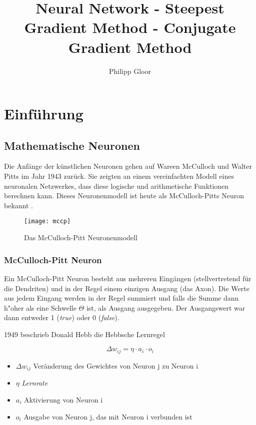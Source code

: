 \documentclass[10pt]{article}
\renewcommand{\sectionmark}[1]{\markboth{\MakeUppercase{#1}}{}}
\begin{document}
\title{Neural Network - Steepest Gradient Method - Conjugate Gradient Method}
\author{Philipp Gloor}
\maketitle

\newpage
\pagestyle{fancy}
\renewcommand{\sectionmark}[1]{\markright{#1}{}}
\tableofcontents
\section{Einführung}
\subsection{Mathematische Neuronen}

Die Anfänge der künstlichen Neuronen gehen auf Wareen McCulloch und Walter Pitts im Jahr 1943 zurück. Sie zeigten an einem vereinfachten Modell eines neuronalen Netzwerkes, dass diese logische und arithmetische Funktionen berechnen kann. Dieses Neuronenmodell ist heute als McCulloch-Pitts Neuron bekannt \cite{mccullochpitt}.

\begin{figure}[h!]
\centering
\texttt{[image: mccp]}
\caption{Das McCulloch-Pitt Neuronenmodell}
\end{figure}

\subsubsection{McCulloch-Pitt Neuron}

Ein McCulloch-Pitt Neuron besteht aus mehreren Eingängen (stellvertretend für die Dendriten) und in der Regel einem einzigen Ausgang (das Axon). Die Werte aus jedem Eingang werden in der Regel summiert und falls die Summe dann h"oher als eine Schwelle $\Theta$ ist, als Ausgang ausgegeben. Der Ausgangswert war dann entweder 1 (\textit{true}) oder 0 (\textit{false}).

1949 beschrieb Donald Hebb die Hebbsche Lernregel

\begin{equation}
\Delta w_{ij} = \eta\cdot a_i\cdot o_i
\end{equation}
\begin{itemize}
\item \( \Delta w_{ij} \) Veränderung des Gewichtes von Neuron j zu Neuron i
\item \( \eta \) \textit{Lernrate}
\item \( a_i  \) Aktivierung von Neuron i
\item \( o_i  \) Ausgabe von Neuron j, das mit Neuron i verbunden ist
\end{itemize}
\end{document}
